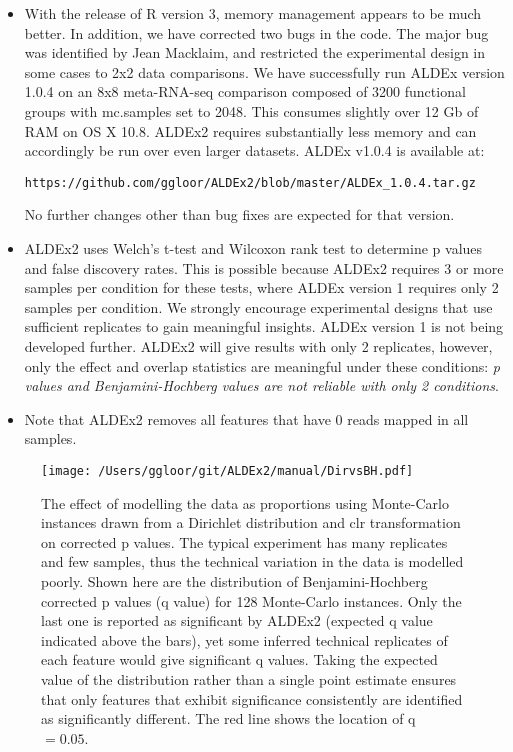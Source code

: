 \documentclass[11pt]{article}
\begin{document}
\begin{itemize}

\item With the release of R version 3, memory management appears to be much better. In addition, we have corrected two bugs in the code. The major bug was identified by Jean Macklaim, and restricted the experimental design in some cases to 2x2 data comparisons. We have successfully run ALDEx version 1.0.4 on an 8x8 meta-RNA-seq comparison composed of 3200 functional groups with mc.samples set to 2048. This consumes slightly over 12 Gb of RAM on OS X 10.8. ALDEx2  requires substantially less memory and can accordingly be run over even larger datasets. ALDEx v1.0.4 is available at: \begin{verbatim}https://github.com/ggloor/ALDEx2/blob/master/ALDEx_1.0.4.tar.gz\end{verbatim} No further changes other than bug fixes are expected for that version. 

\item ALDEx2 uses Welch's t-test and Wilcoxon rank test to determine p values and false discovery rates. This is possible because ALDEx2 requires 3 or more samples per condition for these tests, where ALDEx version 1 requires only 2 samples per condition. We strongly encourage experimental designs that use sufficient replicates to gain meaningful insights. ALDEx version 1 is not being developed further. ALDEx2 will give results with only 2 replicates, however, only the effect and overlap statistics are meaningful under these conditions: \emph{p values and Benjamini-Hochberg values are not reliable with only 2 conditions}.

\item Note that ALDEx2 removes all features that have 0 reads mapped in all samples.
\end{itemize}
\begin{wrapfigure}{r}{0.5\textwidth}\vspace{-1cm}
\vspace{-1cm}
\begin{center}
\texttt{[image: /Users/ggloor/git/ALDEx2/manual/DirvsBH.pdf]}
\caption{The effect of modelling the data as proportions using Monte-Carlo instances drawn from a Dirichlet distribution and clr transformation on corrected p values. The typical experiment has many replicates and few samples, thus the technical variation in the data is modelled poorly. Shown here are the distribution of Benjamini-Hochberg corrected p values (q value) for 128 Monte-Carlo instances. Only the last one is reported as significant by ALDEx2 (expected q value indicated above the bars), yet some inferred technical replicates of each feature would give significant q values. Taking the expected value of the distribution rather than a single point estimate ensures that only features that exhibit significance consistently are identified as significantly different. The  red line shows the location of q\ $=0.05$. }
\label{dirvsbh}
\end{center}\vspace{-.5cm}
\end{wrapfigure}
\end{document}
